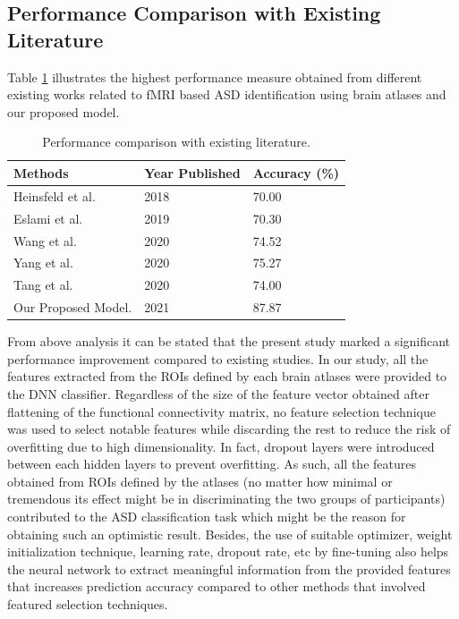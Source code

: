 \subsection{Performance Comparison with Existing Literature}

Table \ref{tab:4.7} illustrates the highest performance measure obtained from different existing works related to fMRI based ASD identification using brain atlases and our proposed model.

\begin{table}[!htb]
\begin{center}
    \caption{Performance comparison with existing literature.}
    \label{tab:4.7}
\begin{tabular}{|l|l|l|}
\hline
\textbf{Methods}          & \textbf{Year   Published} & \textbf{Accuracy   (\%)} \\ \hline
Heinsfeld et al. \cite{heinsfeld2018identification} & 2018                      & 70.00                    \\ \hline
Eslami et al. \cite{eslami2019asd}    & 2019                      & 70.30                    \\ \hline
Wang et al. \cite{wang2020aimafe}      & 2020                      & 74.52                    \\ \hline
Yang et al. \cite{yangdeep}      & 2020                      & 75.27                    \\ \hline
Tang et al. \cite{tang2020deep}     & 2020                      & 74.00                    \\ \hline
Our Proposed Model. \cite{subah2021deep}        & 2021                        & 87.87                    \\ \hline
\end{tabular}
\end{center}
\end{table}

From above analysis it can be stated that the present study marked a significant performance improvement compared to existing studies.  
In our study, all the features extracted from the ROIs defined by each brain atlases were
provided to the DNN classifier. Regardless of the size of the feature vector obtained after flattening of the functional connectivity matrix, no feature selection technique was used to select notable features while discarding the
rest to reduce the risk of overfitting due to high dimensionality. In fact, dropout layers were introduced between each hidden layers to prevent
overfitting. As such, all the features obtained from ROIs defined by the atlases (no
matter how minimal or tremendous its effect might be in discriminating the two
groups of participants) contributed to the ASD classification task which might be the
reason for obtaining such an optimistic result. Besides, the use of
suitable optimizer, weight initialization technique, learning rate, dropout rate, etc by
fine-tuning also helps the neural network to extract meaningful information from the
provided features that increases prediction accuracy compared to other 
methods that involved featured selection techniques. 

